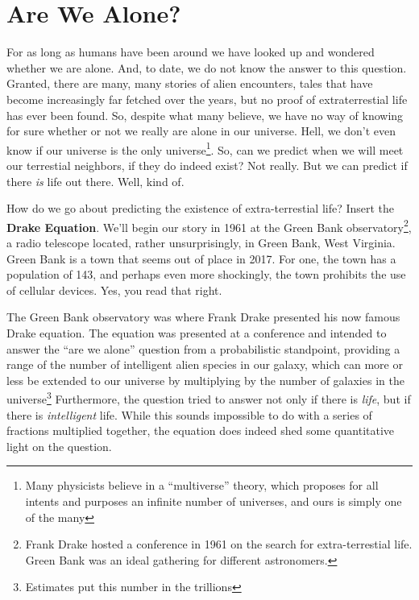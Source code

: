 \documentclass[12pt,twoside]{book}
\newcommand{\imp}[1]{\textbf{#1}}
\begin{document}
	\chapter[The Drake Equation]{Are We Alone?}
	For as long as humans have been around we have looked up and wondered whether we are alone. 
	And, to date, we do not know the answer to this question.  Granted, there are many, many stories of alien encounters, tales that have become increasingly far fetched over the years, but no proof of extraterrestial life has ever been found. So, despite what many believe, we have no way of knowing for sure whether or not we really are alone in our universe.  Hell, we don't even know if our universe is the only universe\footnote{Many physicists believe in a ``multiverse'' theory, which proposes for all intents and purposes an infinite number of universes, and ours is simply one of the many}. So, can we predict when we will meet our terrestial neighbors, if they do indeed exist?  Not really.  But we can predict if there \emph{is} life out there.  Well, kind of.  
	
	How do we go about predicting the existence of extra-terrestial life?  Insert the \imp{Drake Equation}. We'll begin our story in 1961 at the Green Bank observatory\footnote{ Frank Drake hosted a conference in 1961 on the search for extra-terrestial life.  Green Bank was an ideal gathering for different astronomers.}, a radio telescope located, rather unsurprisingly, in Green Bank, West Virginia.\cite{GreenBank} Green Bank is a town that seems out of place in 2017. For one, the town has a population of 143, and perhaps even more shockingly, the town prohibits the use of cellular devices.  Yes, you read that right.  
	
	The Green Bank observatory was where Frank Drake presented his now famous Drake equation.  The equation was presented at a conference and intended to answer the ``are we alone'' question from a probabilistic standpoint, providing a range of the number of intelligent alien species in our galaxy, which can more or less be extended to our universe by multiplying by the number of galaxies in the universe\cite{numgalax}\footnote{Estimates put this number in the trillions} Furthermore, the question tried to answer not only if there is \emph{life}, but if there is \emph{intelligent} life.  While this sounds impossible to do with a series of fractions multiplied together, the equation does indeed shed some quantitative light on the question.
	
\end{document}
